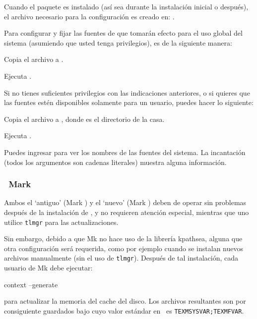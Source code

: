 \documentclass{article}
\begin{document}
Cuando el paquete  es instalado (así sea
durante la instalación inicial o después), el archivo
necesario para la configuración es creado en:
. 

Para configurar y fijar las fuentes de \TL{} que tomarán efecto para
el uso global del sistema (asumiendo que usted tenga privilegios),
es de la siguiente manera:
\begin{enumerate*} 
	\item Copia el archivo  a
.  \item Ejecuta
.  
\end{enumerate*}

Si no tienes suficientes privilegios con las indicaciones anteriores, o
si quieres que las fuentes estén disponibles solamente para un
usuario, puedes hacer lo siguiente:
\begin{enumerate*}
	\item Copia el archivo  a , donde \filename{~} es el directorio de la casa. 
	\item Ejecuta . 
\end{enumerate*}

Puedes ingresar  para ver los nombres de las fuentes del
sistema. La incantación 
(todos los argumentos son cadenas literales) muestra alguna
información.

\subsubsection{\ConTeXt\ Mark }
\label{sec:context-mkiv}

Ambos el `antiguo' \ConTeXt{} (Mark ) y el `nuevo' \ConTeXt{}
(Mark ) deben de operar sin problemas después de la
instalación de \TL{}, y no requieren atención especial, mientras que
uno utilice \verb+tlmgr+ para las actualizaciones. 

Sin embargo, debido a que \ConTeXt{} Mk no hace uso
de la librería kpathsea, alguna que otra configuración será
requerida, como por ejemplo cuando se instalan nuevos
archivos manualmente (sin el uso de
\verb+tlmgr+). Después de tal instalación, cada usuario de Mk
debe ejecutar:
\begin{sverbatim}
context --generate
\end{sverbatim}
para actualizar la memoria del cache del disco.  Los
archivos resultantes son por consiguiente guardados bajo
 cuyo valor estándar en \TL\ es
\verb+TEXMSYSVAR;TEXMFVAR+.
\end{document}
